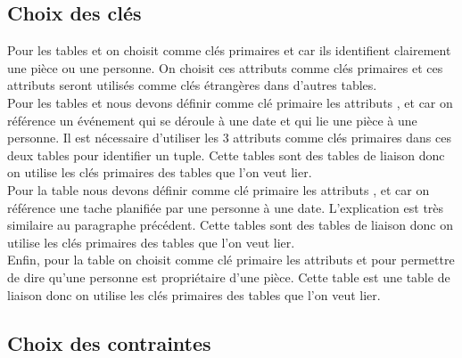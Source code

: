 \subsection{Choix des clés}
Pour les tables \textbf{} et \textbf{} on choisit comme clés primaires  et  car ils identifient clairement une pièce ou une personne. On choisit ces attributs comme clés primaires et ces attributs seront utilisés comme clés étrangères dans d'autres tables.\\

Pour les tables \textbf{} et \textbf{} nous devons définir comme clé primaire les attributs ,  et  car on référence un événement qui se déroule à une date et qui lie une pièce à une personne. Il est nécessaire d'utiliser les 3 attributs comme clés primaires dans ces deux tables pour identifier un tuple. Cette tables sont des tables de liaison donc on utilise les clés primaires des tables que l'on veut lier.\\

Pour la table \textbf{}  nous devons définir comme clé primaire les attributs ,  et  car on référence une tache planifiée par une personne à une date. L'explication est très similaire au paragraphe précédent. Cette tables sont des tables de liaison donc on utilise les clés primaires des tables que l'on veut lier.\\

Enfin, pour la table \textbf{} on choisit comme clé primaire les attributs  et  pour permettre de dire qu'une personne est propriétaire d'une pièce. Cette table est une table de liaison donc on utilise les clés primaires des tables que l'on veut lier.


\subsection{Choix des contraintes}